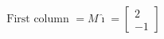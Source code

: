 \documentclass[preview]{standalone}
\begin{document}
\begin{align*}
\text{First column } = M\hat{\imath} = \begin{bmatrix} 2 \\ -1 \end{bmatrix}
\end{align*}
\end{document}
